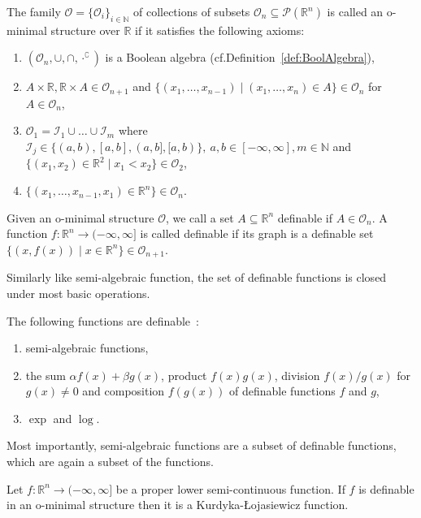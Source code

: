 \begin{definition}
The family $\mathcal{O}=\{\mathcal{O}_i\}_{i\in\mathbb{N}}$ of collections of subsets $\mathcal{O}_n\subseteq\mathcal{P}(\mathbb{R}^n)$ is called an o-minimal structure over $\mathbb{R}$ if it satisfies the following axioms:
\begin{enumerate}
    \item $(\mathcal{O}_n,\cup, \cap,\cdot^\complement)$ is a Boolean algebra (cf.\@ Definition~\ref{def:BoolAlgebra}),
    \item $A\times\mathbb{R},\mathbb{R}\times A\in\mathcal{O}_{n+1}$ and $\{(x_1,\ldots, x_{n-1})\mid (x_1,\ldots,x_n)\in A\}\in \mathcal{O}_{n}$ for $A\in\mathcal{O}_{n}$, 
    \item $\mathcal{O}_1=\mathcal{I}_1\cup\ldots\cup \mathcal{I}_m$ where $\mathcal{I}_j\in\{(a,b),[a,b],(a,b],[a,b)\},\ a,b\in[-\infty,\infty], m\in\mathbb{N}$ and $\{(x_1,x_2)\in\mathbb{R}^2\mid x_1<x_2\}\in\mathcal{O}_2$,
    \item $\{(x_1,\ldots,x_{n-1},x_1)\in\mathbb{R}^n\}\in\mathcal{O}_n$.
\end{enumerate}
Given an o-minimal structure $\mathcal{O}$, we call a set $A\subseteq\mathbb{R}^n$ definable if $A\in\mathcal{O}_n$. A function $f:\mathbb{R}^{n}\rightarrow (-\infty,\infty]$ is called definable if its graph is a definable set $\{(x,f(x))\mid x\in\mathbb{R}^n\}\in\mathcal{O}_{n+1}$.
\end{definition}
Similarly like semi-algebraic function, the set of definable functions is closed under most basic operations.
\begin{example}The following functions are definable~\citep{dries1998tame}:
\begin{enumerate}
    \item semi-algebraic functions,
    \item the sum $\alpha f(x)+\beta g(x)$, product $f(x)g(x)$, division $f(x)/g(x)$ for $g(x)\neq0$ and composition $f(g(x))$ of definable functions $f$ and $g$,
    \item $\exp$ and $\log$.
\end{enumerate}
\end{example}
Most importantly, semi-algebraic functions are a subset of definable functions, which are again a subset of the \KL functions.
\begin{theorem}{{\citep{attouch2010proximal}}}
Let $f:\mathbb{R}^n\rightarrow (-\infty,\infty]$ be a proper lower semi-continuous function. If $f$ is definable in an o-minimal structure then it is a Kurdyka-{\L}ojasiewicz function.
\end{theorem}
